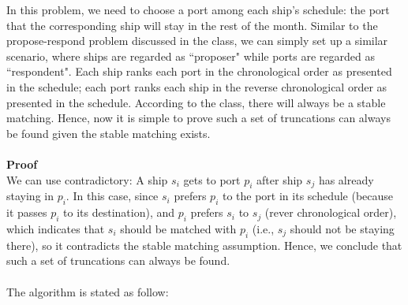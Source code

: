 \documentclass[12pt]{article}
\begin{document}
\setlength{\parindent}{0in}
\addtolength{\parskip}{0.1cm}
\setlength{\fboxrule}{.5mm}\setlength{\fboxsep}{1.2mm}
\newlength{\boxlength}\setlength{\boxlength}{\textwidth}
\addtolength{\boxlength}{-4mm}
\begin{center}
\end{center}
\vspace{5mm}
In this problem, we need to choose a port among each ship's schedule: the port that the corresponding ship will stay in the rest of the month. Similar to the propose-respond problem discussed in the class, we can simply set up a similar scenario, where ships are regarded as ``proposer" while ports are regarded as ``respondent". Each ship ranks each port in the chronological order as presented in the schedule; each port ranks each ship in the reverse chronological order as presented in the schedule. According to the class, there will always be a stable matching. Hence, now it is simple to prove such a set of truncations can always be found given the stable matching exists.\\\\
\textbf{Proof} \\
We can use contradictory: A ship $s_i$ gets to port $p_i$ after ship $s_j$ has already staying in $p_i$. In this case, since $s_i$ prefers $p_i$ to the port in its schedule (because it passes $p_i$ to its destination), and $p_i$ prefers $s_i$ to $s_j$ (rever chronological order), which indicates that $s_i$ should be matched with $p_i$ (i.e., $s_j$ should not be staying there), so it contradicts the stable matching assumption. Hence, we conclude that such a set of truncations can always be found.\\\\  
The algorithm is stated as follow:
\end{document}
